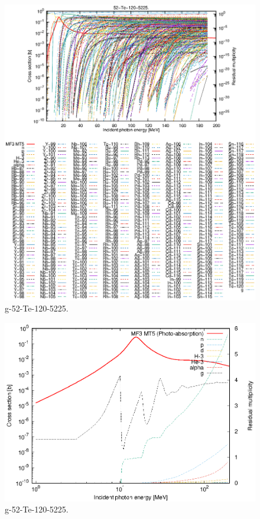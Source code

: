 \begin{figure}
 \includegraphics[width=\linewidth]{eps/g_52-Te-120_5225.eps}
  \caption{g-52-Te-120-5225.}
\end{figure}
\newpage \clearpage

\begin{figure}
 \includegraphics[width=\linewidth]{eps-log/g_52-Te-120_5225.eps}
 \caption{g-52-Te-120-5225.}
\end{figure}
\newpage \clearpage

